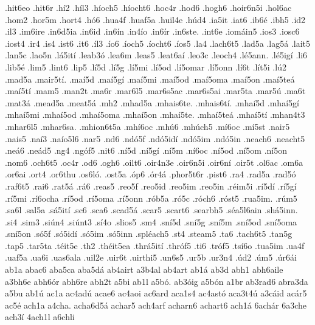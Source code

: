 {.hit6eo
.hit6r
.h^^ed2
.h^^edl3
.h^^edoch5
.h^^edocht6
.hoc4r
.hod6
.hogh6
.hoir6n5i
.hol6ac
.hom2
.hor5m
.hort4
.h^^f36
.hua4f
.huaf5a
.huil4e
.h^^fad4
.ia5it
.iat6
.ib6^^e9
.ibh5
.id2
.il3
.im6ire
.in6d5ia
.in6id
.in6^^edn
.in4^^edo
.in6^^edr
.in6ste.
.int6e
.iom^^e1in5
.ios3
.iosc6
.iost4
.ir4
.is4
.ist6
.it6
.^^edl3
.^^edo6
.^^edoch5
.^^edocht6
.^^edos5
.la4
.lach6t5
.lad5a
.lag5^^e1
.lait5
.lan5c
.lao5n
.l^^e15it^^ed
.leab3^^f3
.lea6m
.leas5
.leat6a^^ed
.leo3c
.leoch4
.l^^e95ann.
.l^^e95ig^^ed
.li6
.lib5^^e9
.lim5
.lint6
.lip5
.l^^ed5d
.l^^ed5g
.l^^ed5mi
.l^^ed5od
.l^^ed5omar
.l^^ed5onn
.l^^ed6t
.l^^edt5i
.l^^fa2
.mad5a
.mair5t^^ed.
.ma^^ed5d
.ma^^ed5g^^ed
.ma^^ed5mi
.ma^^ed5od
.ma^^ed5oma
.ma^^ed5on
.ma^^ed5te^^e1
.ma^^ed5t^^ed
.mam5
.man2t
.ma6r
.mar6l5
.mar6s5ac
.mar6s5ai
.mar5ta
.mar5^^fa
.ma6t
.mat3^^e1
.mead5a
.meat5^^e1
.mh2
.mhad5a
.mhais6te.
.mhais6t^^ed.
.mha^^ed5d
.mha^^ed5g^^ed
.mha^^ed5mi
.mha^^ed5od
.mha^^ed5oma
.mha^^ed5on
.mha^^ed5te.
.mha^^ed5te^^e1
.mha^^ed5t^^ed
.mhan4t3
.mhar6l5
.mhar6sa.
.mhion6t5a
.mh^^ed6oc
.mh^^fa6
.mh^^fach5
.m^^ed6oc
.m^^ed5st
.nair5
.nais5
.na^^ed3
.na^^edo5l6
.nar5
.nd6
.nd^^f35f
.nd^^f35id^^ed
.nd^^f35im
.nd^^f35in
.neach6
.neacht5
.ne^^e16
.ne^^e1d5
.ng4
.ng^^f3f5
.nit6
.n^^ed5d
.n^^ed5g^^ed
.n^^ed5m
.n^^ed6oc
.n^^ed5od
.n^^ed5om
.n^^ed5on
.nom6
.och6t5
.oc4r
.od6
.ogh6
.oilt6
.oir4n3e
.oir6n5i
.oir6n^^ed
.oir5t
.ol6ac
.om6a
.or6ai
.ort4
.or6thu
.os6l^^f3.
.ost5a
.^^f3p6
.^^f3r4^^e1
.phor5t6r
.pist6
.ra4
.rad5a
.rad5^^f3
.raf6t5
.rai6
.rat5^^e1
.r^^e16
.reas5
.reo5f
.reo5id
.reo5im
.reo5in
.r^^e9im5i
.r^^ed5d^^ed
.r^^ed5g^^ed
.r^^ed5mi
.r^^ed6ocha
.r^^ed5od
.r^^ed5oma
.r^^ed5onn
.r^^f3b5a
.r^^f35c
.r^^f3ch6
.r^^f3st5
.rua5im.
.r^^fam5
.sa6l
.sal5a
.s^^e15it^^ed
.sc6
.sca6
.scad5^^e1
.scar5
.scart6
.searbh5
.s^^e9a5l6ain
.sh^^e15inn.
.si4
.sim3
.si^^fan4
.si^^fant3
.s^^ed4o
.slios5
.sm4
.sn^^ed5d
.sn^^ed5g
.sn^^ed5m
.sn^^ed5od
.sn^^ed5oma
.sn^^ed5on
.s^^f35f
.s^^f35id^^ed
.s^^f35im
.s^^f35inn
.spl^^e9ach5
.st4
.steam5
.ta6
.tach6t5
.tan5g
.tap5
.tar5ta
.t^^e9it5e
.th2
.th^^e9it5ea
.thr^^e15it^^ed
.thr^^f3f5
.ti6
.tr^^f3f5
.ts^^ed6o
.tua5im
.ua4f
.uaf5a
.ua6i
.uas6ala
.uil2e
.uir6t
.uirthi5
.un6s5
.ur5b
.ur3n4
.^^fad2
.^^fam5
.^^far6^^e1i
ab1a
abac6
aba5ca
aba5d^^e1
ab4airt
a3b4al
ab4art
ab1^^e1
ab3d
abh1
abh6aile
a3bh6e
abh6^^f3r
abh6re
abh2t
a5bi
ab1l
a5b^^f3.
ab3^^f3ig
a5b^^f3n
a1br
ab3rad6
abra3da
a5bu
ab1^^fa
ac1a
ac4ad^^fa
acae6
ac4aoi
ac6ard
aca1s4
ac4ast^^f3
aca3t4^^fa
a3c^^e1id
ac^^e1r5
ac5^^e9
ach1a
a4cha.
acha6d5^^e1
achar5
ach4arf
acharn6
achart6
ach1^^e1
6ach^^e1r
6a3che
ach3^^ed
4ach1l
a6chli
}
